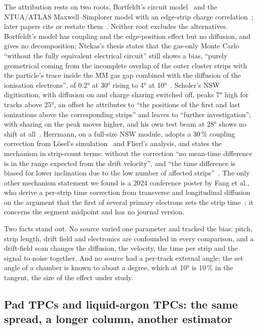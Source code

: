 The attribution rests on two roots, Bortfeldt's circuit model~\cite{Bortfeldt2014} and the NTUA/ATLAS Maxwell--Simplorer model
with an edge-strip charge correlation~\cite{Ntekas2016}; later papers cite or restate them~\cite{Sessa2014,Vanadia2015,Rinnagel2019,Alexeev2019,Farinelli2019}.
Neither root excludes the alternatives. Bortfeldt's model has coupling and the edge-position effect but no diffusion, and
gives no decomposition; Ntekas's thesis states that the gas-only Monte Carlo ``without the fully equivalent electrical circuit''
still shows a bias, ``purely geometrical coming from the incomplete overlap of the outer cluster strips with the particle's
trace inside the MM gas gap combined with the diffusion of the ionisation electrons'', of \ang{0.2} at \ang{30} rising to \ang{4} at
\ang{10}~\cite{Ntekas2016}. Scholer's NSW digitisation, with diffusion on and charge sharing switched off, peaks \ang{7} high for
tracks above \ang{25}, an offset he attributes to ``the positions of the first and last ionizations above the corresponding
strips'' and leaves to ``further investigation''; with sharing on the peak moves higher, and his own test beam at \ang{28} shows no
shift at all~\cite{Scholer2021}. Herrmann, on a full-size NSW module, adopts a 30\,\% coupling correction from Lösel's
simulation~\cite{Loesel2017} and Flierl's analysis, and states the mechanism in strip-count terms: without the correction ``no
mean-time difference is in the range expected from the drift velocity'', and ``the time difference is biased for lower
inclination due to the low number of affected strips''~\cite{Herrmann2019}. The only other mechanism statement we found is a
2024 conference poster by Fang et al., who derive a per-strip time correction from transverse and longitudinal diffusion on the
argument that the first of several primary electrons sets the strip time~\cite{Fang2024}; it concerns the segment midpoint and
has no journal version.

Two facts stand out. No source varied one parameter and tracked the bias: pitch, strip length, drift field and electronics are
confounded in every comparison, and a drift-field scan changes the diffusion, the velocity, the time per strip and the signal
to noise together. And no source had a per-track external angle; the set angle of a chamber is known to about a degree, which at
\ang{10} is 10\,\% in the tangent, the size of the effect under study.

\subsection{Pad TPCs and liquid-argon TPCs: the same spread, a longer column, another estimator}

